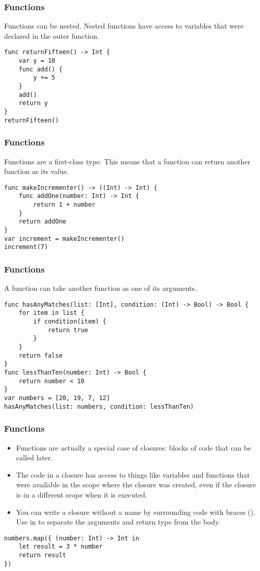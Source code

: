 \begin{frame}[fragile] \frametitle{Functions}
Functions can be nested. Nested functions have access to variables that were declared in the outer function.


\begin{lstlisting}
func returnFifteen() -> Int {
    var y = 10
    func add() {
        y += 5
    }
    add()
    return y
}
returnFifteen()
\end{lstlisting}


\end{frame}

\begin{frame}[fragile] \frametitle{Functions}

Functions are a first-class type. This means that a function can return another function as its value.
\begin{lstlisting}
func makeIncrementer() -> ((Int) -> Int) {
    func addOne(number: Int) -> Int {
        return 1 + number
    }
    return addOne
}
var increment = makeIncrementer()
increment(7)
\end{lstlisting}

\end{frame}


\begin{frame}[fragile] \frametitle{Functions}
A function can take another function as one of its arguments.

\begin{lstlisting}
func hasAnyMatches(list: [Int], condition: (Int) -> Bool) -> Bool {
    for item in list {
        if condition(item) {
            return true
        }
    }
    return false
}
func lessThanTen(number: Int) -> Bool {
    return number < 10
}
var numbers = [20, 19, 7, 12]
hasAnyMatches(list: numbers, condition: lessThanTen)
\end{lstlisting}

\end{frame}


\begin{frame}[fragile] \frametitle{Functions}
\begin{itemize}
\item Functions are actually a special case of closures: blocks of code that can be called later. 
\item The code in a closure has access to things like variables and functions that were available in the scope where the closure was created, even if the closure is in a different scope when it is executed.
\item You can write a closure without a name by surrounding code with braces ({}). Use in to separate the arguments and return type from the body.
\end{itemize}

\begin{lstlisting}
numbers.map({ (number: Int) -> Int in
    let result = 3 * number
    return result
})
\end{lstlisting}

\end{frame}


